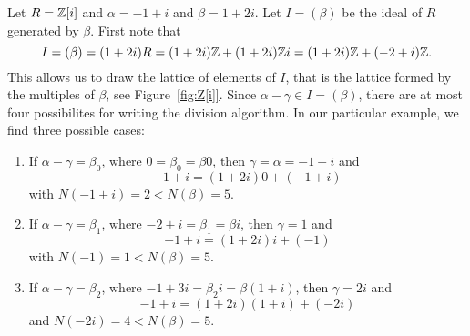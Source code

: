 \begin{example}
	Let $R=\mathbb{Z}[i]$ and 
	$\alpha=-1+i$ and $\beta=1+2i$. Let $I=(\beta)$ be the ideal of $R$ generated by $\beta$. 
	First note that
	\[
	I=(\beta)=(1+2i)R=(1+2i)\mathbb{Z}+(1+2i)\mathbb{Z} i=(1+2i)\mathbb{Z}+(-2+i)\mathbb{Z}.
	\]  
	This allows us to draw the lattice of elements of $I$, 
	that is the lattice formed by the multiples of $\beta$, see Figure~\ref{fig:Z[i]}. 
	Since $\alpha-\gamma\in I=(\beta)$, there are at most four possibilites for writing
	the division algorithm. 
	In our particular example, we find three possible cases:
	\begin{enumerate}
		\item If $\alpha-\gamma=\beta_0$, where $0=\beta_0=\beta 0$, 
			then $\gamma=\alpha=-1+i$ and 
				\[
				-1+i=(1+2i)0+(-1+i)
				\]
				with $N(-1+i)=2<N(\beta)=5$. 
		\item If $\alpha-\gamma=\beta_1$, where $-2+i=\beta_1=\beta i$, then 
			$\gamma=1$ and 
			\[
			-1+i=(1+2i)i+(-1)
			\]
			with $N(-1)=1<N(\beta)=5$. 
		\item If $\alpha-\gamma=\beta_2$, where $-1+3i=\beta_2i=\beta (1+i)$, 
			then $\gamma=2i$ and  
			\[
			-1+i=(1+2i)(1+i)+(-2i)
			\]
			and $N(-2i)=4<N(\beta)=5$. 
	\end{enumerate}
\end{example}

